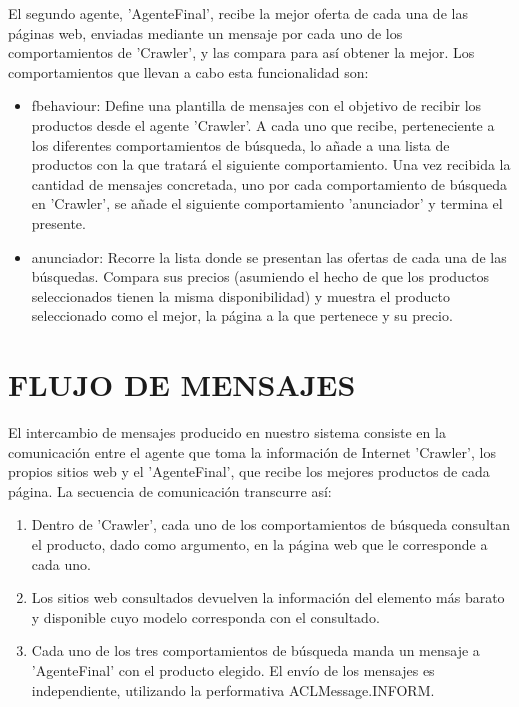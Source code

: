 \documentclass{pre-tfg}
\begin{document}
El segundo agente, 'AgenteFinal', recibe la mejor oferta de cada una de las páginas web, enviadas mediante un mensaje por cada uno de los comportamientos de 'Crawler', y las compara para así obtener la mejor. Los comportamientos que llevan a cabo esta funcionalidad son:
\begin{itemize}
 	\item fbehaviour: Define una plantilla de mensajes con el objetivo de recibir los productos desde el agente 'Crawler'. A cada uno que recibe, perteneciente a los diferentes comportamientos de búsqueda, lo añade a una lista de productos con la que tratará el siguiente comportamiento. Una vez recibida la cantidad de mensajes concretada, uno por cada comportamiento de búsqueda en 'Crawler', se añade el siguiente comportamiento 'anunciador' y termina el presente.
 	\item anunciador: Recorre la lista donde se presentan las ofertas de cada una de las búsquedas. Compara sus precios (asumiendo el hecho de que los productos seleccionados tienen la misma disponibilidad) y muestra el producto seleccionado como el mejor, la página a la que pertenece y su precio.
\end{itemize}

\section{FLUJO DE MENSAJES}
El intercambio de mensajes producido en nuestro sistema consiste en la comunicación entre el agente que toma la información de Internet 'Crawler', los propios sitios web y el 'AgenteFinal', que recibe los mejores productos de cada página. La secuencia de comunicación transcurre así:
\begin{enumerate}
	\item Dentro de 'Crawler', cada uno de los comportamientos de búsqueda consultan el producto, dado como argumento, en la página web que le corresponde a cada uno.
	\item Los sitios web consultados devuelven la información del elemento más barato y disponible cuyo modelo corresponda con el consultado.
	\item Cada uno de los tres comportamientos de búsqueda manda un mensaje a 'AgenteFinal' con el producto elegido. El envío de los mensajes es independiente, utilizando la performativa ACLMessage.INFORM.
\end{enumerate}
\end{document}
